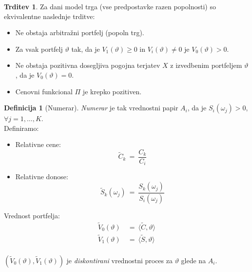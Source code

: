 \documentclass[11pt]{article}
\newcommand{\1}{\mathbbm{1}}
\theoremstyle{definition}
\newtheorem{definicija}{Definicija}[section]
\theoremstyle{definition}
\newtheorem{trditev}{Trditev}[section]
\begin{document}
\begin{trditev}

Za dani model trga (vse predpostavke razen popolnosti) so ekvivalentne naslednje trditve:
\begin{itemize}

	\item Ne obstaja arbitražni portfelj (popoln trg).
	
	\item Za vsak portfelj $\vartheta$ tak, da je $V_1(\vartheta) \geq 0$ in $V_i(\vartheta) \neq 0$ je $V_0(\vartheta) > 0$.
	
	\item Ne obstaja pozitivna dosegljiva pogojna terjatev $X$ z izvedbenim portfeljem $\vartheta$, da je $V_0(\vartheta) = 0$.
	
	\item Cenovni funkcional $\Pi$ je krepko pozitiven.

\end{itemize}

\end{trditev}
\vspace{0.5cm}

\begin{definicija}[Numerar]

\textit{Numerar} je tak vrednostni papir $A_i$, da je $S_i(\omega_j) > 0$, $\forall j = 1,\ldots, K$. \\

\noindent Definiramo:
\begin{itemize}
	
	\item Relativne cene:
	$$\tilde{C}_k ~=~ \frac{C_k}{C_i}$$
	
	\item Relativne donose:
	$$\tilde{S}_k(\omega_j) ~=~ \frac{S_k(\omega_j)}{S_i(\omega_j)}$$
	
\end{itemize} 

\noindent Vrednost portfelja:
\begin{align*}
\tilde{V}_0(\vartheta) ~&=~ \langle \tilde{C}, \vartheta \rangle \\
\tilde{V}_1(\vartheta) ~&=~ \langle \tilde{S}, \vartheta \rangle
\end{align*} \\

\noindent $(\tilde{V}_0(\vartheta), \tilde{V}_1(\vartheta))$ je \textit{diskontirani} vrednostni proces za $\vartheta$ glede na $A_i$.


\end{definicija}
\vspace{0.5cm}
\end{document}
